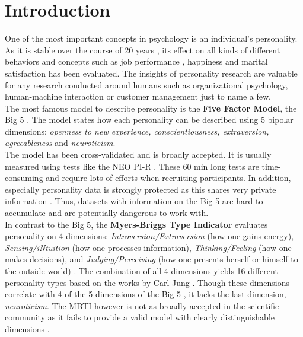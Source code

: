 \section{Introduction}
\label{intro}
One of the most important concepts in psychology is an individual's personality. As it is stable over the course of 20 years \cite{mccrae_introduction_1992}, its effect on all kinds of different behaviors and concepts such as job performance \cite{tett_personality_2006}, happiness \cite{ozer_personality_2006} and marital satisfaction \cite{kelly_personality_1987} has been evaluated. The insights of personality research are valuable for any research conducted around humans such as organizational psychology, human-machine interaction or customer management just to name a few.\\
The most famous model to describe personality is the \textbf{Five Factor Model}, the Big 5 \cite{mccrae_introduction_1992}. The model states how each personality can be described using 5 bipolar dimensions: \emph{openness to new experience, conscientiousness, extraversion, agreeableness} and \emph{neuroticism}.\\
The model has been cross-validated and is broadly accepted. It is usually measured using tests like the NEO PI-R \cite{mccrae_introduction_1992}. These 60 min long tests are time-consuming and require lots of efforts when recruiting participants. In addition, especially personality data is strongly protected as this shares very private information \cite{kosinski_facebook_2015}. Thus, datasets with information on the Big 5 are hard to accumulate and are potentially dangerous to work with.\\
In contrast to the Big 5, the \textbf{Myers-Briggs Type Indicator} evaluates personality on 4 dimensions: \emph{Introversion/Extraversion} (how one gains energy), \emph{Sensing/iNtuition} (how one processes information), \emph{Thinking/Feeling} (how one makes decisions), and \emph{Judging/Perceiving} (how one presents herself or himself to the outside world) \cite{myers_mbti_1998}. The combination of all 4 dimensions yields 16 different personality types based on the works by Carl Jung \cite{jung_personality_2014}. Though these dimensions correlate with 4 of the 5 dimensions of the Big 5 \cite{mccrae_reinterpreting_1989}, it lacks the last dimension, \emph{neuroticism}. The MBTI however is not as broadly accepted in the scientific community as it fails to provide a valid model with clearly distinguishable dimensions \cite{boyle_myers-briggs_1995,mccrae_reinterpreting_1989}.\\

